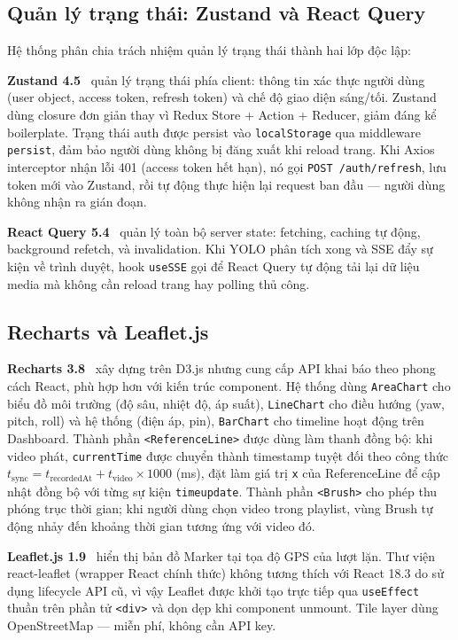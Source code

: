 \documentclass[../DoAn.tex]{subfiles}
\begin{document}
\subsection{Quản lý trạng thái: Zustand và React Query}

Hệ thống phân chia trách nhiệm quản lý trạng thái thành hai lớp độc lập:

\textbf{Zustand 4.5}~\cite{zustand} quản lý trạng thái phía client: thông tin xác thực người dùng (user object, access token, refresh token) và chế độ giao diện sáng/tối. Zustand dùng closure đơn giản thay vì Redux Store + Action + Reducer, giảm đáng kể boilerplate. Trạng thái auth được persist vào \texttt{localStorage} qua middleware \texttt{persist}, đảm bảo người dùng không bị đăng xuất khi reload trang. Khi Axios interceptor nhận lỗi 401 (access token hết hạn), nó gọi \texttt{POST /auth/refresh}, lưu token mới vào Zustand, rồi tự động thực hiện lại request ban đầu --- người dùng không nhận ra gián đoạn.

\textbf{React Query 5.4}~\cite{reactquery} quản lý toàn bộ server state: fetching, caching tự động, background refetch, và invalidation. Khi YOLO phân tích xong và SSE đẩy sự kiện về trình duyệt, hook \texttt{useSSE} gọi  để React Query tự động tải lại dữ liệu media mà không cần reload trang hay polling thủ công.

\subsection{Recharts và Leaflet.js}

\textbf{Recharts 3.8}~\cite{recharts} xây dựng trên D3.js nhưng cung cấp API khai báo theo phong cách React, phù hợp hơn với kiến trúc component. Hệ thống dùng \texttt{AreaChart} cho biểu đồ môi trường (độ sâu, nhiệt độ, áp suất), \texttt{LineChart} cho điều hướng (yaw, pitch, roll) và hệ thống (điện áp, pin), \texttt{BarChart} cho timeline hoạt động trên Dashboard. Thành phần \texttt{<ReferenceLine>} được dùng làm thanh đồng bộ: khi video phát, \texttt{currentTime} được chuyển thành timestamp tuyệt đối theo công thức $t_{\text{sync}} = t_{\text{recordedAt}} + t_{\text{video}} \times 1000$ (ms), đặt làm giá trị \texttt{x} của ReferenceLine để cập nhật đồng bộ với từng sự kiện \texttt{timeupdate}. Thành phần \texttt{<Brush>} cho phép thu phóng trục thời gian; khi người dùng chọn video trong playlist, vùng Brush tự động nhảy đến khoảng thời gian tương ứng với video đó.

\textbf{Leaflet.js 1.9}~\cite{leaflet} hiển thị bản đồ Marker tại tọa độ GPS của lượt lặn. Thư viện react-leaflet (wrapper React chính thức) không tương thích với React 18.3 do sử dụng lifecycle API cũ, vì vậy Leaflet được khởi tạo trực tiếp qua \texttt{useEffect} thuần trên phần tử \texttt{<div>} và dọn dẹp khi component unmount. Tile layer dùng OpenStreetMap --- miễn phí, không cần API key.
\end{document}
